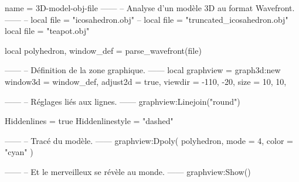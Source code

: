 \documentclass{standalone}
\begin{document}
\begin{luadraw}{name = 3D-model-obj-file}
------
-- Analyse d'un modèle 3D au format Wavefront.
------
-- local file = "icosahedron.obj"
-- local file = "truncated_icosahedron.obj"
local file = "teapot.obj"

local polyhedron, window_def = parse_wavefront(file)

------
-- Définition de la zone graphique.
------
local graphview = graph3d:new{
  window3d = window_def,
  adjust2d = true,
  viewdir  = {-110, -20},
  size     = {10, 10},
}

------
-- Réglages liés aux lignes.
------
graphview:Linejoin("round")

Hiddenlines     = true
Hiddenlinestyle = "dashed"

------
-- Tracé du modèle.
------
graphview:Dpoly(
  polyhedron,
  {
    mode  = 4,
    color = "cyan"
  })

------
-- Et le merveilleux se révèle au monde.
------
graphview:Show()
\end{luadraw}
\end{document}
